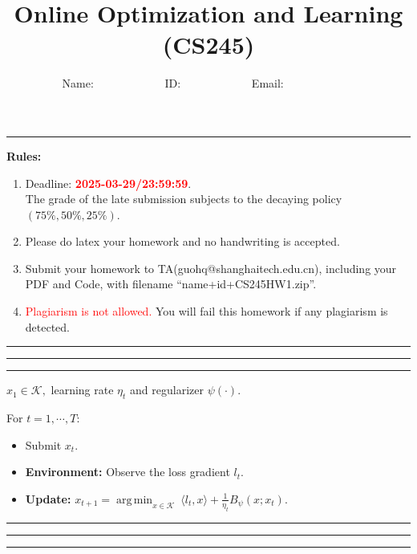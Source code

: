 \documentclass[11pt,oneside,a4paper]{article}
\title{Online Optimization and Learning (CS245)}
\author{Name: ~~~~~~~~~~~~ID: ~~~~~~~~~~~~Email: ~~~~~~~~~~~~}
\date{}
\DeclareMathOperator*{\argmin}{arg\,min}
\begin{document}
\maketitle
\noindent
\rule{\linewidth}{0.4pt}
{\bf {\large Rules:}}
\begin{enumerate} 
    \item Deadline: \textcolor{red}{\textbf{2025-03-29/23:59:59}}.\\ The grade of the late submission subjects to the decaying policy $(75\%, 50\%, 25\%)$.
    \item Please do latex your homework and no handwriting is accepted.
    \item Submit your homework to TA(guohq@shanghaitech.edu.cn), including your PDF and Code, with filename ``{\sf name+id+CS245HW1.zip}''.
    \item \textcolor{red}{Plagiarism is not allowed.} You will fail this homework if any plagiarism is detected.
    \end{enumerate}
    \vspace{-0.3cm}
\rule{\linewidth}{0.4pt}

\newpage

\vspace{0.5cm}

\vspace{0.1in}
\hrule
\vspace{0.05in}
\vspace{0.05in}
\hrule
\vspace{0.05in}

 $x_1\in \mathcal K,$ learning rate $\eta_t$ and regularizer $\psi(\cdot).$  

\noindent For $t=1,\cdots, T:$ 
\begin{itemize}
\item {}  Submit $x_t.$
\item {\bf Environment:} Observe the loss gradient $l_t$.
\item {\bf Update:} $x_{t+1} = \argmin_{x\in \mathcal K} ~\langle l_t,x \rangle + \frac{1}{\eta_t} B_\psi(x;x_{t}).$

\end{itemize}
\vspace{0.02in}
\hrule
\vspace{0.1in}

\vspace{0.1in}
\hrule
\vspace{0.05in}
\vspace{0.05in}
\hrule
\vspace{0.05in}
\end{document}
